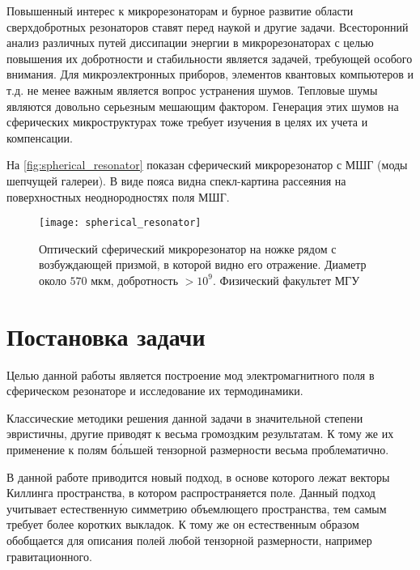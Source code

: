 \documentclass[12pt,a4paper]{article}
\begin{document}
        Повышенный интерес к микрорезонаторам и бурное развитие области сверхдобротных резонаторов ставят перед наукой и другие задачи. Всесторонний анализ различных путей диссипации энергии в микрорезонаторах с целью повышения их добротности и стабильности является задачей, требующей особого внимания. Для микроэлектронных приборов, элементов квантовых компьютеров и т.д. не менее важным является вопрос устранения шумов. Тепловые шумы являются довольно серьезным мешающим фактором. Генерация этих шумов на сферических микроструктурах тоже требует изучения в целях их учета и компенсации.

        На \autoref{fig:spherical_resonator} показан сферический микрорезонатор с МШГ (моды шепчущей галереи). В виде пояса видна спекл-картина рассеяния на поверхностных неоднородностях поля МШГ.
        \begin{figure}[h]
            \centering
            \texttt{[image: spherical\_resonator]}
            \caption[]{Оптический сферический микрорезонатор на ножке рядом с возбуждающей призмой, в которой видно его отражение. Диаметр около $570$ мкм, добротность $> 10^9$. Физический факультет МГУ \cite{microresonators}}
            \label{fig:spherical_resonator}
        \end{figure}


    \section{Постановка задачи}

        Целью данной работы является построение мод электромагнитного поля в сферическом резонаторе и исследование их термодинамики.

        Классические методики решения данной задачи в значительной степени эвристичны, другие приводят к весьма громоздким результатам. К тому же их применение к полям б\'{о}льшей тензорной размерности весьма проблематично. \cite{burlankov_tmf}

        В данной работе приводится новый подход, в основе которого лежат векторы Киллинга пространства, в котором распространяется поле. Данный подход учитывает естественную симметрию объемлющего пространства, тем самым требует более коротких выкладок. К тому же он естественным образом обобщается для описания полей любой тензорной размерности, например гравитационного. \cite{burlankov_tmf}
\end{document}

